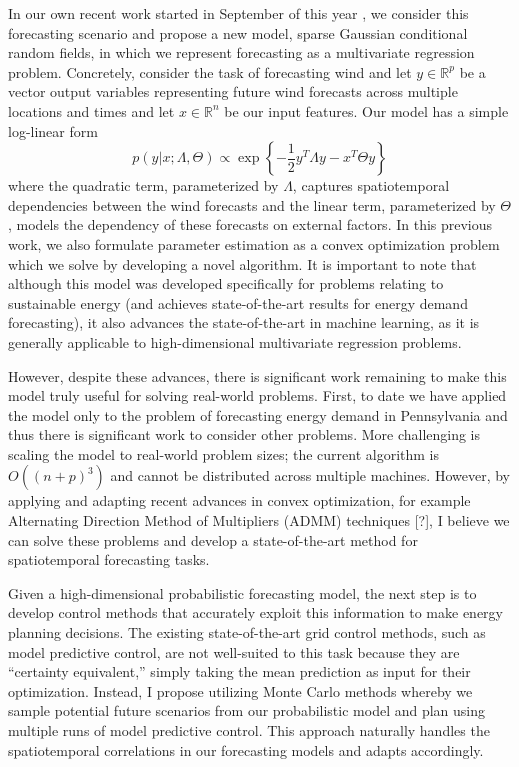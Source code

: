 \documentclass[12pt]{article}
\begin{document}
In our own recent work started in September of this year \cite{wytock.12}, we consider this forecasting scenario and propose a new model, sparse Gaussian conditional random fields, in which we represent forecasting as a multivariate regression problem. Concretely, consider the task of forecasting wind and let $y \in \mathbb{R}^p$ be a vector output variables representing future wind forecasts across multiple locations and times and let $x \in \mathbb{R}^n$ be our input features. Our model has a simple log-linear form
\begin{equation}
p(y|x;\Lambda,\Theta) \propto \exp \left\{ -\frac{1}{2}y^T\Lambda y - x^T\Theta y \right\}
\end{equation}
where the quadratic term, parameterized by $\Lambda$, captures spatiotemporal dependencies between the wind forecasts and the linear term, parameterized by $\Theta$, models the dependency of these forecasts on external factors. In this previous work, we also formulate parameter estimation as a convex optimization problem which we solve by developing a novel algorithm. It is important to note that although this model was developed specifically for problems relating to sustainable energy (and achieves state-of-the-art results for energy demand forecasting), it also advances the state-of-the-art in machine learning, as it is generally applicable to high-dimensional multivariate regression problems.

However, despite these advances, there is significant work remaining to make this model truly useful for solving real-world problems. First, to date we have applied the model only to the problem of forecasting energy demand in Pennsylvania and thus there is significant work to consider other problems. More challenging is scaling the model to real-world problem sizes; the current algorithm is $O((n+p)^3)$ and cannot be distributed across multiple machines. However, by applying and adapting recent advances in convex optimization, for example Alternating Direction Method of Multipliers (ADMM) techniques [?], I believe we can solve these problems and develop a state-of-the-art method for spatiotemporal forecasting tasks.

Given a high-dimensional probabilistic forecasting model, the next step is to develop control methods that accurately exploit this information to make energy planning decisions. The existing state-of-the-art grid control methods, such as model predictive control, are not well-suited to this task because they are ``certainty equivalent,'' simply taking the mean prediction as input for their optimization. Instead, I propose utilizing Monte Carlo methods whereby we sample potential future scenarios from our probabilistic model and plan using multiple runs of model predictive control. This approach naturally handles the spatiotemporal correlations in our forecasting models and adapts accordingly.
\end{document}
